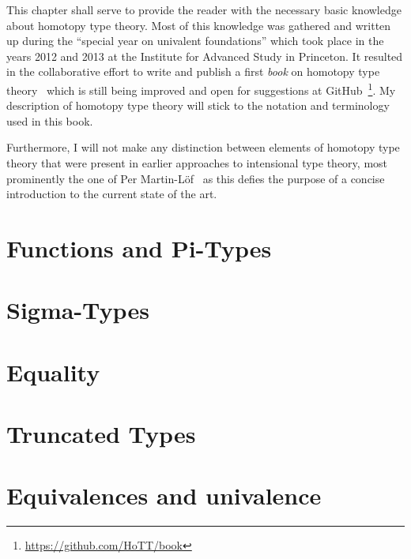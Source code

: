 This chapter shall serve to provide the reader with the necessary basic knowledge
about homotopy type theory.
Most of this knowledge was gathered and written up during the ``special year 
on univalent foundations'' which took place in the years 2012 and 2013
at the Institute for Advanced Study in Princeton.
It resulted in the collaborative effort to write and publish a first \emph{book}
on homotopy type theory~\cite{hottbook} which is still being improved and open
for suggestions at GitHub~\footnote{\url{https://github.com/HoTT/book}}.
My description of homotopy type theory will stick to the notation and terminology
used in this book.

Furthermore, I will not make any distinction between elements of homotopy type
theory that were present in earlier approaches to intensional type theory,
most prominently the one of Per Martin-L\"of~\cite{martin-lof1} as this
defies the purpose of a concise introduction to the current state of the art.


\section{Functions and Pi-Types}

\section{Sigma-Types}

\section{Equality}

\section{Truncated Types}

\section{Equivalences and univalence}
